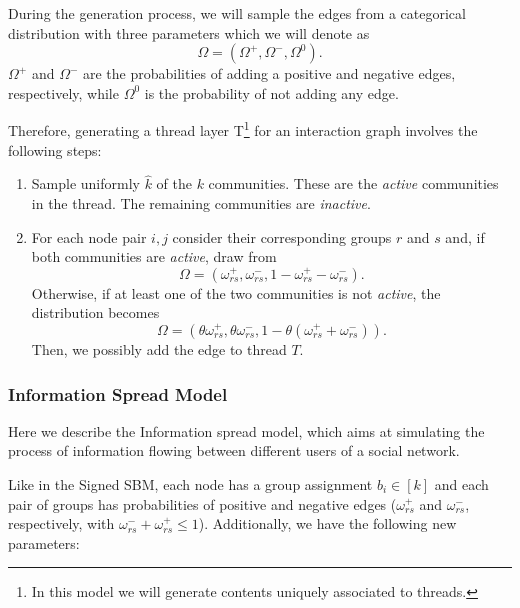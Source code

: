 During the generation process, we will sample the edges from a categorical
distribution with three parameters which we will denote as
\begin{equation*}
	\Omega = (\Omega^+, \Omega ^-, \Omega ^0).
\end{equation*}
$\Omega ^+$ and $\Omega ^-$ are the probabilities of adding a positive and
negative edges, respectively, while $\Omega ^0$ is the probability of not
adding any edge.

\bigskip

Therefore, generating a thread layer T\footnote{In this model we will generate
	contents uniquely associated to threads.} for an interaction graph
involves the following steps:
\begin{enumerate}
	\item Sample uniformly $\hat{k}$ of the $k$ communities. These are the
	      \emph{active} communities in the thread. The remaining communities
	      are \emph{inactive}.
	\item For each node pair $i, j$ consider their corresponding groups $r$ and
	      $s$ and, if both communities are \emph{active},
	      draw from
	      \begin{equation*}
		      \Omega = (\omega _{rs} ^{+}, \omega _{rs} ^{-}, 1 - \omega _{rs}
		      ^{+} - \omega _{rs} ^{-}).
	      \end{equation*}
	      Otherwise, if at least one of the
	      two communities is not \emph{active}, the distribution becomes
	      \begin{equation*}
		      \Omega = (\theta \omega _{rs} ^{+}, \theta \omega _{rs} ^{-}, 1 - \theta
		      (\omega _{rs} ^{+} + \omega _{rs} ^{-})).
	      \end{equation*}
	      Then, we possibly add the edge to thread $T$.

\end{enumerate}

\subsubsection{Information Spread Model}%
\label{ssub:information_spread_model}

Here we describe the Information spread model, which aims at simulating the
process of information flowing between different users of a social network.

Like in the Signed SBM, each node has a group assignment $b_i \in [k]$ and
each pair of groups has probabilities of
positive and negative edges ($\omega _{rs}^{+}  $ and $\omega _{rs}^{-}  $,
respectively, with $\omega ^{-} _{rs} + \omega ^{+} _{rs}
	\leq 1$).
Additionally, we have the following new parameters:

